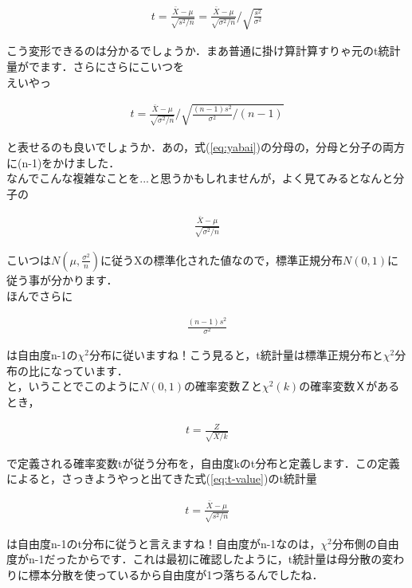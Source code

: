 \documentclass[11pt,a4paper,uplatex]{ujreport} 	%
\begin{document}
\begin{align}
  t = \frac{\bar{X}-\mu}{\sqrt{s^2/n}} = \frac{\bar{X}-\mu}{\sqrt{\sigma^2/n}} / \sqrt{\frac{s^2}{\sigma^2}}
  \label{eq:yabai}
\end{align}

こう変形できるのは分かるでしょうか．まあ普通に掛け算計算すりゃ元のt統計量がでます．さらにさらにこいつを\\

えいやっ

\begin{align}
  t = \frac{\bar{X}- \mu}{\sqrt{\sigma^2/n}} / \sqrt{\frac{(n-1)s^2}{\sigma^2}/(n-1)}
\end{align}

と表せるのも良いでしょうか．あの，式(\ref{eq:yabai})の分母の，分母と分子の両方に(n-1)をかけました．\\

なんでこんな複雑なことを...と思うかもしれませんが，よく見てみるとなんと分子の

\begin{align}
  \frac{\bar{X}- \mu}{\sqrt{\sigma^2/n}}
\end{align}

こいつは$N(\mu, \frac{\sigma^2}{n})$に従うXの標準化された値なので，標準正規分布$N(0,1)$に従う事が分かります．\\

ほんでさらに

\begin{align}
  \frac{(n-1)s^2}{\sigma^2}
\end{align}

は自由度n-1の$\chi^2$分布に従いますね！こう見ると，t統計量は標準正規分布と$\chi^2$分布の比になっています．\\

と，いうことでこのように$N(0,1)$の確率変数Ｚと$\chi^2(k)$の確率変数Ｘがあるとき，

\begin{align}
  t = \frac{Z}{\sqrt{X/k}}
\end{align}

で定義される確率変数tが従う分布を，自由度kのt分布と定義します．この定義によると，さっきようやっと出てきた式(\ref{eq:t-value})のt統計量

\begin{align}
  t = \frac{\bar{X}- \mu}{\sqrt{s^2/n}}
\end{align}

は自由度n-1のt分布に従うと言えますね！自由度がn-1なのは，$\chi^2$分布側の自由度がn-1だったからです．これは最初に確認したように，t統計量は母分散の変わりに標本分散を使っているから自由度が1つ落ちるんでしたね．\\\\
\end{document}
